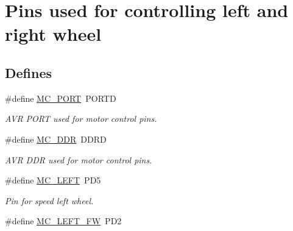 \hypertarget{group___m_c___p_i_n_s}{\section{\-Pins used for controlling left and right wheel}
\label{group___m_c___p_i_n_s}
}
\subsection*{\-Defines}
\begin{DoxyCompactItemize}
\item 
\hypertarget{group___m_c___p_i_n_s_gade4d9adc2fb51f9d4697a5b17ff9659d}{\#define \hyperlink{group___m_c___p_i_n_s_gade4d9adc2fb51f9d4697a5b17ff9659d}{\-M\-C\-\_\-\-P\-O\-R\-T}~\-P\-O\-R\-T\-D}\label{group___m_c___p_i_n_s_gade4d9adc2fb51f9d4697a5b17ff9659d}

\begin{DoxyCompactList}\small\item\em \-A\-V\-R \-P\-O\-R\-T used for motor control pins. \end{DoxyCompactList}\item 
\hypertarget{group___m_c___p_i_n_s_gaf248c583aa63761168322d4f9d59c24d}{\#define \hyperlink{group___m_c___p_i_n_s_gaf248c583aa63761168322d4f9d59c24d}{\-M\-C\-\_\-\-D\-D\-R}~\-D\-D\-R\-D}\label{group___m_c___p_i_n_s_gaf248c583aa63761168322d4f9d59c24d}

\begin{DoxyCompactList}\small\item\em \-A\-V\-R \-D\-D\-R used for motor control pins. \end{DoxyCompactList}\item 
\hypertarget{group___m_c___p_i_n_s_ga4b4e05b59627be30c01b2a052c8d143a}{\#define \hyperlink{group___m_c___p_i_n_s_ga4b4e05b59627be30c01b2a052c8d143a}{\-M\-C\-\_\-\-L\-E\-F\-T}~\-P\-D5}\label{group___m_c___p_i_n_s_ga4b4e05b59627be30c01b2a052c8d143a}

\begin{DoxyCompactList}\small\item\em \-Pin for speed left wheel. \end{DoxyCompactList}\item 
\hypertarget{group___m_c___p_i_n_s_ga6d6ada18e848708206bc1fbf1305e5ee}{\#define \hyperlink{group___m_c___p_i_n_s_ga6d6ada18e848708206bc1fbf1305e5ee}{\-M\-C\-\_\-\-L\-E\-F\-T\-\_\-\-F\-W}~\-P\-D2}\label{group___m_c___p_i_n_s_ga6d6ada18e848708206bc1fbf1305e5ee}


\end{DoxyCompactItemize}
